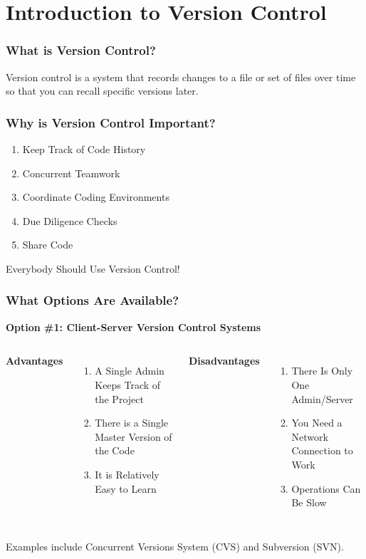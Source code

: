 
\section[Intro]{Introduction to Version Control}

\begin{frame}
\frametitle{\large{What is Version Control?}}
Version control is a system that records changes to a file or set of files over time so that you can recall specific versions later.
\end{frame}

\begin{frame}
\frametitle{\large{Why is Version Control Important?}}
\begin{enumerate}
\item Keep Track of Code History
\pause
\item Concurrent Teamwork
\pause
\item Coordinate Coding Environments
\pause
\item Due Diligence Checks
\pause
\item Share Code
\end{enumerate}
\pause
\vspace{5mm}
Everybody Should Use Version Control!
\end{frame}

\begin{frame}
\frametitle{\large{What Options Are Available?}}
\textbf{Option \#1: Client-Server Version Control Systems}
\vspace{8mm}
\begin{columns}[c]
\column{2in}
{\small \textbf{Advantages}}
\begin{enumerate}
\small
\item A Single Admin Keeps Track of the Project
\item There is a Single Master Version of the Code
\item It is Relatively Easy to Learn
\end{enumerate}
\column{2in}
{\small \textbf{Disadvantages} }
\begin{enumerate}
\small
\item There Is Only One Admin/Server
\item You Need a Network Connection to Work
\item Operations Can Be Slow
\end{enumerate}
\end{columns}
\vspace{5mm}
{\small Examples include Concurrent Versions System (CVS) and Subversion (SVN).}
\end{frame}

